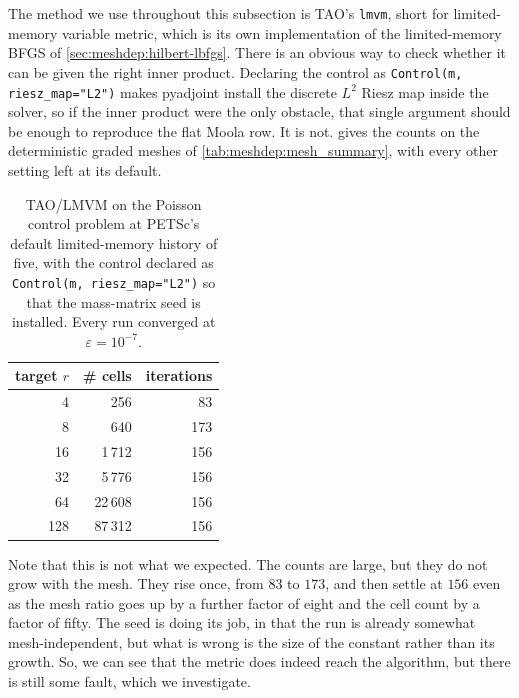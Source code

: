 \documentclass[a4paper,11pt]{article}
\theoremstyle{spacedplain} \newtheorem{theorem}[counter]{Theorem} \newtheorem{lemma}[counter]{Lemma} \newtheorem{prop}[counter]{Proposition} \newtheorem{cor}[counter]{Corollary}
\theoremstyle{spaceddefinition} \newtheorem{defn}[counter]{Definition} \newtheorem{example}[counter]{Example} \newtheorem{remark}[counter]{Remark}
\begin{document}
The method we use throughout this subsection is TAO's \texttt{lmvm}, short for limited-memory variable metric, which is its own implementation of the limited-memory BFGS of \cref{sec:meshdep:hilbert-lbfgs}. There is an obvious way to check whether it can be given the right inner product. Declaring the control as \texttt{Control(m, riesz\_map="L2")} makes pyadjoint install the discrete $L^{2}$ Riesz map inside the solver, so if the inner product were the only obstacle, that single argument should be enough to reproduce the flat Moola row. It is not.  gives the counts on the deterministic graded meshes of \cref{tab:meshdep:mesh_summary}, with every other setting left at its default.

\begin{table}[H]
  \centering
  \begin{tabular}{r r r}
    \toprule
    {target $r$} & {\# cells} & {iterations} \\
    \midrule
      4 &     256 &  83 \\
      8 &     640 & 173 \\
     16 &   1\,712 & 156 \\
     32 &   5\,776 & 156 \\
     64 &  22\,608 & 156 \\
    128 &  87\,312 & 156 \\
    \bottomrule
  \end{tabular}
  \caption{TAO/LMVM on the Poisson control problem at PETSc's default limited-memory history of five, with the control declared as \texttt{Control(m, riesz\_map="L2")} so that the mass-matrix seed is installed. Every run converged at $\varepsilon = 10^{-7}$.}
  \label{tab:meshdep:lmvm-hist5}
\end{table}

Note that this is not what we expected. The counts are large, but they do not grow with the mesh. They rise once, from $83$ to $173$, and then settle at $156$ even as the mesh ratio goes up by a further factor of eight and the cell count by a factor of fifty. The seed is doing its job, in that the run is already somewhat mesh-independent, but what is wrong is the size of the constant rather than its growth. So, we can see that the metric does indeed reach the algorithm, but there is still some fault, which we investigate.
\end{document}
